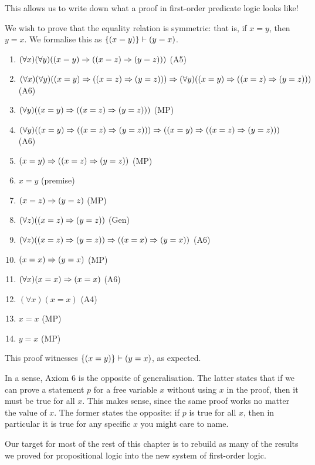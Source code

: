 \documentclass{article}
\begin{document}
This allows us to write down what a proof in first-order predicate logic looks like!

\begin{example}
    We wish to prove that the equality relation is symmetric: that is, if $x = y$, then $y = x$. We formalise this as $\left\lbrace (x = y) \right\rbrace \vdash (y = x)$.
    \begin{enumerate}
	    \item $(\forall x)(\forall y)((x=y) \Rightarrow ((x=z) \Rightarrow (y=z)))$ \hfill (A5)
	    \item $(\forall x)(\forall y)((x=y) \Rightarrow ((x=z) \Rightarrow (y=z))) \Rightarrow (\forall y)((x=y) \Rightarrow ((x=z) \Rightarrow (y=z)))$ \hfill (A6)
	    \item $(\forall y)((x=y) \Rightarrow ((x=z) \Rightarrow (y=z)))$ \hfill (MP)
	    \item $(\forall y)((x=y) \Rightarrow ((x=z) \Rightarrow (y=z))) \Rightarrow ((x=y) \Rightarrow ((x=z) \Rightarrow (y=z)))$ \hfill (A6)
	    \item $(x=y) \Rightarrow ((x=z) \Rightarrow (y=z))$ \hfill (MP)
	    \item $x=y$ \hfill (premise)
	    \item $(x=z) \Rightarrow (y=z)$ \hfill (MP)
	    \item $(\forall z)((x=z) \Rightarrow (y=z))$ \hfill (Gen)
	    \item $(\forall z)((x=z) \Rightarrow (y=z)) \Rightarrow ((x=x) \Rightarrow (y=x))$ \hfill (A6)
	    \item $(x=x) \Rightarrow (y=x)$ \hfill (MP)
	    \item $(\forall x)(x = x) \Rightarrow (x = x)$ \hfill (A6)
	    \item $(\forall x)(x = x)$ \hfill (A4)
	    \item $x = x$ \hfill (MP)
	    \item $y = x$ \hfill (MP)
	\end{enumerate}
	This proof witnesses $\left\lbrace (x = y) \right\rbrace \vdash (y = x)$, as expected.
\end{example}

\begin{note}
	In a sense, Axiom 6 is the opposite of generalisation. The latter states that if we can prove a statement $p$ for a free variable $x$ without using $x$ in the proof, then it must be true for all $x$. This makes sense, since the same proof works no matter the value of $x$. The former states the opposite: if $p$ is true for all $x$, then in particular it is true for any specific $x$ you might care to name.
\end{note}

Our target for most of the rest of this chapter is to rebuild as many of the results we proved for propositional logic into the new system of first-order logic. 
\end{document}
